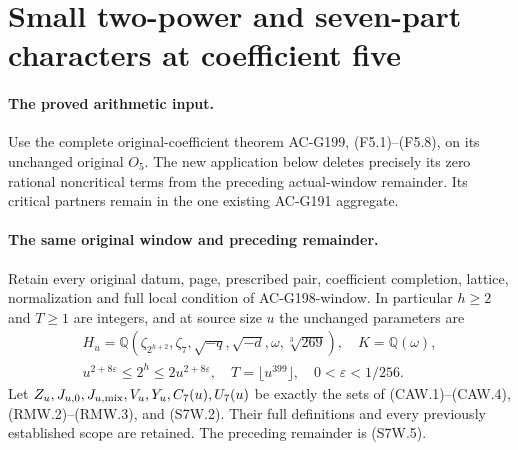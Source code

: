 \section{Small two-power and seven-part characters at coefficient five}
\label{sec:coefficient-five-actual-window}

\paragraph{The proved arithmetic input.}
Use the complete original-coefficient theorem AC-G199,
(F5.1)--(F5.8), on its unchanged original $O_5$.
The new application below deletes precisely its zero rational
noncritical terms from the preceding actual-window remainder.
Its critical partners remain in the one existing AC-G191 aggregate.

\paragraph{The same original window and preceding remainder.}
Retain every original datum, page, prescribed pair, coefficient
completion, lattice, normalization and full local condition of
AC-G198-window. In particular $h\geq2$ and $T\geq1$ are integers,
and at source size $u$ the unchanged parameters are
\[
 \begin{gathered}
 H_u=\mathbb Q(\zeta_{2^{h+2}},\zeta_7,\sqrt{-q},\sqrt{-d},
                    \omega,\sqrt[3]{269}),\quad K=\mathbb Q(\omega),\\
 u^{2+8\varepsilon}\leq2^h\leq2u^{2+8\varepsilon},\quad
 T=\lfloor u^{399}\rfloor,\quad0<\varepsilon<1/256.
 \end{gathered}\tag{F5W.1}
\]
Let $Z_u,J_{u,0},J_{u,\rm mix},V_u,Y_u,C_7(u),U_7(u)$ be exactly
the sets of (CAW.1)--(CAW.4), (RMW.2)--(RMW.3), and (S7W.2).
Their full definitions and every previously established scope are
retained. The preceding remainder is (S7W.5).

